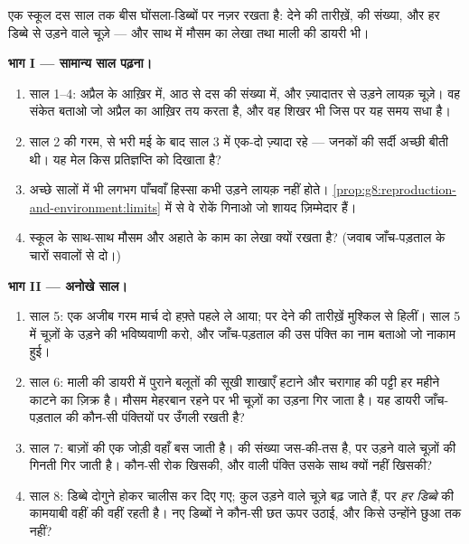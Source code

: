 \begin{problem}[{सप्ताहांत समस्या --- नीली चिड़ियों के दस साल,
डिब्बा-दर-डिब्बा जाँचे हुए}]\label{pb:g8:reproduction-and-environment:1}
एक स्कूल दस साल तक बीस घोंसला-डिब्बों पर नज़र रखता है:  देने की
तारीख़ें,  की संख्या, और हर डिब्बे से उड़ने वाले चूज़े --- और साथ
में मौसम का लेखा तथा माली की डायरी भी।

\medskip\noindent\textbf{भाग I --- सामान्य साल पढ़ना।}
\begin{enumerate}
  \item साल 1--4:  अप्रैल के आख़िर में, आठ से दस की संख्या में,
        और ज़्यादातर  से उड़ने लायक़ चूज़े। वह संकेत बताओ जो
        अप्रैल का आख़िर तय करता है, और वह शिखर भी जिस पर यह समय सधा
        है।
  \item साल 2 की गरम,  से भरी मई के बाद साल 3 में  एक-दो
        ज़्यादा रहे --- जनकों की सर्दी अच्छी बीती थी। यह मेल किस
        प्रतिज्ञप्ति को दिखाता है?
  \item अच्छे सालों में भी लगभग पाँचवाँ हिस्सा  कभी उड़ने लायक़
        नहीं होते।
        \cref{prop:g8:reproduction-and-environment:limits} में से वे
        रोकें गिनाओ जो शायद ज़िम्मेदार हैं।
  \item स्कूल  के साथ-साथ मौसम और अहाते के काम का लेखा क्यों
        रखता है? (जवाब जाँच-पड़ताल के चारों सवालों से दो।)
\end{enumerate}

\medskip\noindent\textbf{भाग II --- अनोखे साल।}
\begin{enumerate}[resume]
  \item साल 5: एक अजीब गरम मार्च  दो हफ़्ते पहले ले आया; पर
         देने की तारीख़ें मुश्किल से हिलीं। साल 5 में चूज़ों के
        उड़ने की भविष्यवाणी करो, और जाँच-पड़ताल की उस पंक्ति का नाम
        बताओ जो नाकाम हुई।
  \item साल 6: माली की डायरी में पुराने बलूतों की सूखी शाखाएँ हटाने
        और चरागाह की पट्टी हर महीने काटने का ज़िक्र है। मौसम मेहरबान
        रहने पर भी चूज़ों का उड़ना गिर जाता है। यह डायरी जाँच-पड़ताल
        की कौन-सी पंक्तियों पर उँगली रखती है?
  \item साल 7: बाज़ों की एक जोड़ी वहाँ बस जाती है।  की संख्या
        जस-की-तस है, पर उड़ने वाले चूज़ों की गिनती गिर जाती है।
        कौन-सी रोक खिसकी, और \emph{} वाली पंक्ति उसके साथ क्यों
        नहीं खिसकी?
  \item साल 8: डिब्बे दोगुने होकर चालीस कर दिए गए; कुल उड़ने वाले
        चूज़े बढ़ जाते हैं, पर \emph{हर डिब्बे} की कामयाबी वहीं की
        वहीं रहती है। नए डिब्बों ने कौन-सी छत ऊपर उठाई, और किसे उन्होंने
        छुआ तक नहीं?
\end{enumerate}


\end{problem}
